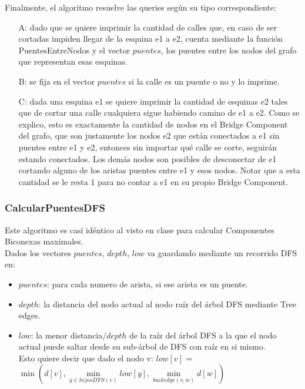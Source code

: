 Finalmente, el algoritmo resuelve las queries según su tipo correspondiente:
\begin{itemize}
	\item[A: ] dado que se quiere imprimir la cantidad de calles que, en caso de ser cortadas impiden llegar de la 
	esquina e1 a e2, cuenta mediante la función PuentesEntreNodos y el vector $puentes$, los puentes entre los nodos 
	del grafo que representan esas esquinas.
	\item[B: ] se fija en el vector $puentes$ si la calle es un puente o no y lo imprime.
	\item[C: ] dada una esquina e1 se quiere imprimir la cantidad de esquinas e2 tales que de cortar una calle cualquiera 
	sigue habiendo camino de e1 a e2. Como se explico, esto es exactamente la cantidad de nodos en el Bridge Component del
	grafo, que son justamente los nodos e2 que están conectados a e1 sin puentes entre e1 y e2, entonces sin importar
	qué calle se corte, seguirán estando conectados. Los demás nodos son posibles de desconectar de e1 cortando alguno
	de los aristas puentes entre e1 y esos nodos. Notar que a esta cantidad se le resta 1 para no contar a e1 en su 
	propio Bridge Component.
\end{itemize}

\subsubsection*{CalcularPuentesDFS}

Este algoritmo es cas\'i idéntico al visto en clase para calcular Componentes Biconexas maximales. \\

Dados los vectores $puentes$, $depth$, $low$ va guardando mediante un recorrido DFS en:
\begin{itemize}
	\item $puentes$: para cada numero de arista, si ese arista es un puente.
	\item $depth$: la distancia del nodo actual al nodo raíz del \'arbol DFS mediante Tree edges.
	\item $low$: la menor distancia/$depth$ de la raíz del \'arbol DFS a la que el nodo actual puede saltar
	desde su sub-\'arbol de DFS con raíz en si mismo. \\
	Esto quiere decir que dado el nodo v: $low[v]$ = $\min(d[v], \min\limits_{y \in hijosDFS(v)} low[y], \min\limits_{backedge(v,w)} d[w])$
\end{itemize}

